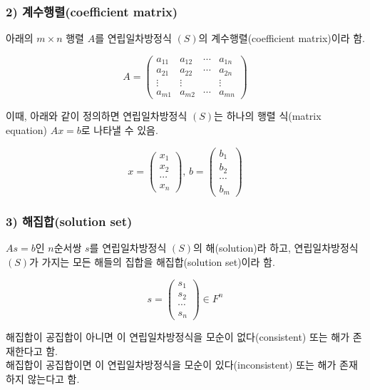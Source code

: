 \subsubsection*{2) 계수행렬(coefficient matrix)\\}
\begin{DEF}
아래의 $m \times n$ 행렬 $A$를 연립일차방정식 $(S)$의 계수행렬(coefficient matrix)이라 함.

\[
A=
\begin{pmatrix}
a_{11} & a_{12} & \cdots & a_{1n}\\
a_{21} & a_{22} & \cdots & a_{2n}\\
\vdots & \vdots & & \vdots \\
a_{m1} & a_{m2} & \cdots & a_{mn}
\end{pmatrix}
\]
\end{DEF}

이때, 아래와 같이 정의하면 연립일차방정식 $(S)$는 하나의 행렬 식(matrix equation) $Ax=b$로 나타낼 수 있음.

\[
x=
\begin{pmatrix}
x_1 \\
x_2 \\
\cdots \\
x_n
\end{pmatrix}
,\,b=
\begin{pmatrix}
b_1 \\
b_2 \\
\cdots \\
b_m
\end{pmatrix}
\]

\subsubsection*{3) 해집합(solution set)\\}
\begin{DEF}
$As=b$인 $n$순서쌍 $s$를 연립일차방정식 $(S)$의 해(solution)라 하고, 연립일차방정식 $(S)$가 가지는 모든 해들의 집합을 해집합(solution set)이라 함.

\[
s=
\begin{pmatrix}
s_1 \\
s_2 \\
\cdots \\
s_n
\end{pmatrix}
\in F^n
\]
\end{DEF}

해집합이 공집합이 아니면 이 연립일차방정식을 모순이 없다(consistent) 또는 해가 존재한다고 함.\\
해집합이 공집합이면 이 연립일차방정식을 모순이 있다(inconsistent) 또는 해가 존재하지 않는다고 함.

